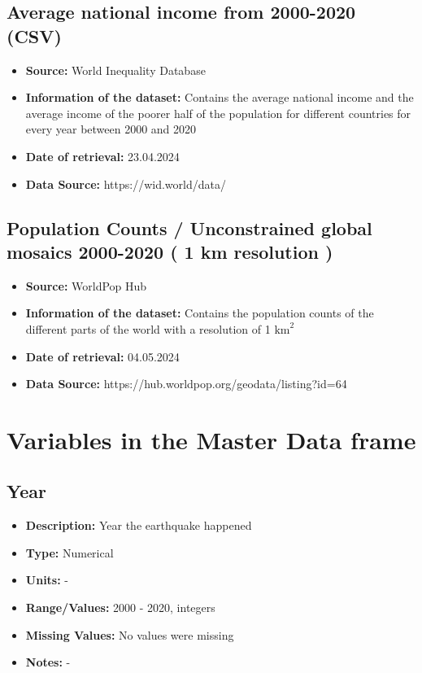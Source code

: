 \documentclass{article}
\begin{document}
\subsection{Average national income from 2000-2020 (CSV)}
\begin{itemize}
\item \textbf{Source:} World Inequality Database
\item \textbf{Information of the dataset:} Contains the average national income and the average income of the poorer half of the population for different countries for every year between 2000 and 2020
\item \textbf{Date of retrieval:} 23.04.2024
\item \textbf{Data Source:} https://wid.world/data/
\end{itemize}

\subsection{Population Counts / Unconstrained global mosaics 2000-2020 ( 1 km resolution )}
\begin{itemize}
\item \textbf{Source:} WorldPop Hub
\item \textbf{Information of the dataset:} Contains the population counts of the different parts of the world with a resolution of 1 $\text{km}^2$
\item \textbf{Date of retrieval:} 04.05.2024
\item \textbf{Data Source:} https://hub.worldpop.org/geodata/listing?id=64
\end{itemize}

\section{Variables in the Master Data frame}

\subsection{Year}
\begin{itemize}
    \item \textbf{Description:} Year the earthquake happened
    \item \textbf{Type:} Numerical
    \item \textbf{Units:} -
    \item \textbf{Range/Values:} 2000 - 2020, integers
    \item \textbf{Missing Values:} No values were missing
    \item \textbf{Notes:} -
\end{itemize}
\end{document}
